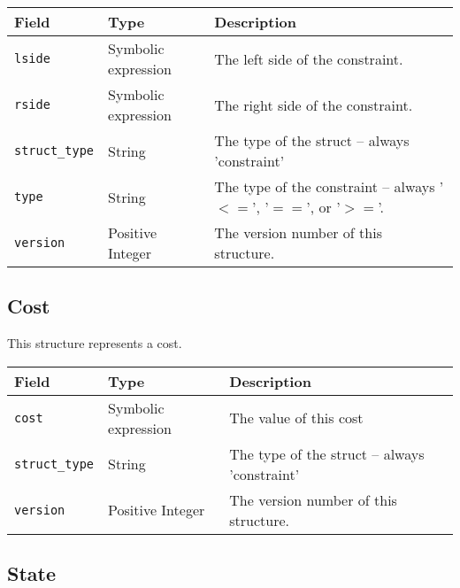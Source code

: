 \documentclass{article}
\begin{document}
			\begin{tabular}{ p{} | p{} | p{152pt}}
				Field                    & Type                             & Description                                    \\ \hline
				\lstinline|lside|        & \raggedright Symbolic expression & The left side of the constraint.               \\[1ex]
				\lstinline|rside|        & \raggedright Symbolic expression & The right side of the constraint.              \\[1ex]
				\lstinline|struct_type|  & String                           & The type of the struct -- always 'constraint'  \\[1ex]
				\lstinline|type|         & String                           & The type of the constraint -- always
				                                                              '$<=$', '$==$', or '$>=$'.                     \\[1ex]
				\lstinline|version|      & \raggedright Positive Integer    & The version number of this structure.
			\end{tabular}

		\subsection{Cost}
			\label{sec:cost}

			This structure represents a cost.\nopagebreak

			\vspace{\baselineskip}\nopagebreak

			\begin{tabular}{ p{} | p{} | p{152pt}}
				Field                    & Type                             & Description                                    \\ \hline
				\lstinline|cost|         & \raggedright Symbolic expression & The value of this cost                         \\[1ex]
				\lstinline|struct_type|  & String                           & The type of the struct -- always 'constraint'  \\[1ex]
				\lstinline|version|      & \raggedright Positive Integer    & The version number of this structure.
			\end{tabular}

		\subsection{State}
			\label{sec:state} %
\end{document}
